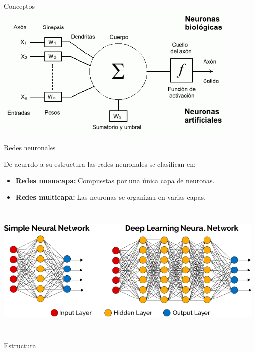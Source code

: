 \documentclass[
  ignorenonframetext,
]{beamer}
\begin{document}
\begin{frame}
\begin{block}{Conceptos}
\includegraphics[width=\textwidth,height=2.60417in]{red2.gif}

\end{block}

\begin{block}{Redes neuronales}

De acuerdo a su estructura las redes neuronales se clasifican en:

\begin{itemize}
\item
  \textbf{Redes monocapa:} Compuestas por una única capa de neuronas.
\item
  \textbf{Redes multicapa:} Las neuronas se organizan en varias capas.
\end{itemize}

\includegraphics[width=\textwidth,height=2.60417in]{simple_profunda.png}

\end{block}

\begin{block}{Estructura}


\end{block}
\end{frame}
\end{document}
